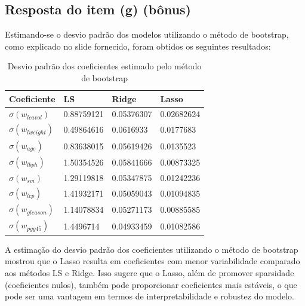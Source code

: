 \subsection{Resposta do item (g) (bônus)}
Estimando-se o desvio padrão dos modelos utilizando o método de bootstrap, como explicado no slide fornecido, foram obtidos os seguintes resultados:

\begin{table}[H]
    \caption{Desvio padrão dos coeficientes estimado pelo método de bootstrap}
    \centering
        \begin{tabular}{|l|lll|}
            \toprule
            Coeficiente & LS & Ridge & Lasso \\
            \midrule
            $\sigma(w_{lcavol})$ & 0.88759121 & 0.05376307 & 0.02682624 \\
            $\sigma(w_{lweight})$ & 0.49864616 & 0.0616933 & 0.0177683 \\
            $\sigma(w_{age})$ & 0.83638015 & 0.05619426 & 0.0135523 \\
            $\sigma(w_{lbph})$ & 1.50354526 & 0.05841666 & 0.00873325 \\
            $\sigma(w_{svi})$ & 1.29119818 & 0.05347875 & 0.01242236 \\
            $\sigma(w_{lcp})$ & 1.41932171 & 0.05059043 & 0.01094835 \\
            $\sigma(w_{gleason})$ & 1.14078834 & 0.05271173 & 0.00885585 \\
            $\sigma(w_{pgg45})$ & 1.4496714 & 0.04933459 & 0.01082586 \\
            \bottomrule
        \end{tabular}
\end{table}


A estimação do desvio padrão dos coeficientes utilizando o método de bootstrap mostrou que o Lasso resulta em coeficientes com menor variabilidade comparado aos métodos LS e Ridge. Isso sugere que o Lasso, além de promover sparsidade (coeficientes nulos), também pode proporcionar coeficientes mais estáveis, o que pode ser uma vantagem em termos de interpretabilidade e robustez do modelo.






